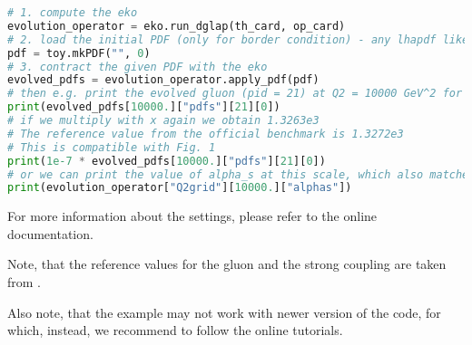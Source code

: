 \begin{lstlisting}[language=Python]
# 1. compute the eko
evolution_operator = eko.run_dglap(th_card, op_card)
# 2. load the initial PDF (only for border condition) - any lhapdf like object will do
pdf = toy.mkPDF("", 0)
# 3. contract the given PDF with the eko
evolved_pdfs = evolution_operator.apply_pdf(pdf)
# then e.g. print the evolved gluon (pid = 21) at Q2 = 10000 GeV^2 for the first point x=1e-7
print(evolved_pdfs[10000.]["pdfs"][21][0])
# if we multiply with x again we obtain 1.3263e3
# The reference value from the official benchmark is 1.3272e3
# This is compatible with Fig. 1
print(1e-7 * evolved_pdfs[10000.]["pdfs"][21][0])
# or we can print the value of alpha_s at this scale, which also matches the reference value: 0.122306
print(evolution_operator["Q2grid"][10000.]["alphas"])
\end{lstlisting}

For more information about the settings, please refer to the online documentation.

Note, that the reference values for the gluon and the strong coupling are taken from \cite[Table 2]{Giele:2002hx}.

Also note, that the example may not work with newer version 
of the code, for which, instead, we recommend to follow the online tutorials.
